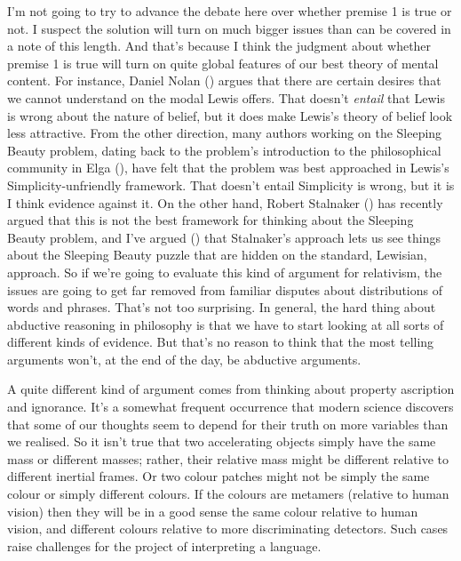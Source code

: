 \documentclass[
  10pt,
  letterpaper,
  DIV=11,
  numbers=noendperiod,
  twoside]{scrartcl}
\begin{document}
I'm not going to try to advance the debate here over whether premise 1
is true or not. I suspect the solution will turn on much bigger issues
than can be covered in a note of this length. And that's because I think
the judgment about whether premise 1 is true will turn on quite global
features of our best theory of mental content. For instance, Daniel
Nolan () argues that there are
certain desires that we cannot understand on the modal Lewis offers.
That doesn't \emph{entail} that Lewis is wrong about the nature of
belief, but it does make Lewis's theory of belief look less attractive.
From the other direction, many authors working on the Sleeping Beauty
problem, dating back to the problem's introduction to the philosophical
community in Elga (), have felt that
the problem was best approached in Lewis's Simplicity-unfriendly
framework. That doesn't entail Simplicity is wrong, but it is I think
evidence against it. On the other hand, Robert Stalnaker
() has recently argued that
this is not the best framework for thinking about the Sleeping Beauty
problem, and I've argued () that Stalnaker's approach lets us see things about the Sleeping
Beauty puzzle that are hidden on the standard, Lewisian, approach. So if
we're going to evaluate this kind of argument for relativism, the issues
are going to get far removed from familiar disputes about distributions
of words and phrases. That's not too surprising. In general, the hard
thing about abductive reasoning in philosophy is that we have to start
looking at all sorts of different kinds of evidence. But that's no
reason to think that the most telling arguments won't, at the end of the
day, be abductive arguments.

A quite different kind of argument comes from thinking about property
ascription and ignorance. It's a somewhat frequent occurrence that
modern science discovers that some of our thoughts seem to depend for
their truth on more variables than we realised. So it isn't true that
two accelerating objects simply have the same mass or different masses;
rather, their relative mass might be different relative to different
inertial frames. Or two colour patches might not be simply the same
colour or simply different colours. If the colours are metamers
(relative to human vision) then they will be in a good sense the same
colour relative to human vision, and different colours relative to more
discriminating detectors. Such cases raise challenges for the project of
interpreting a language.
\end{document}
